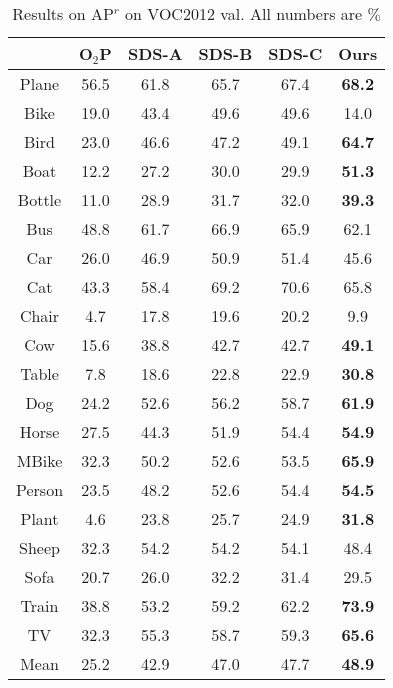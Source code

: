 \documentclass[10pt,twocolumn,letterpaper]{article}
\begin{document}
\begin{table*}[!htb]
\begin{center}
\begin{tabular}{|c|c|c|c|c|c|}         
\hline                               
       & O$_2$P & SDS-A & SDS-B & SDS-C & Ours\\   
\hline                               
Plane & 56.5 & 61.8 & 65.7 & 67.4 & \textbf{68.2} \\                                     
Bike & 19.0 & 43.4 & 49.6 & 49.6 & 14.0 \\                                      
Bird & 23.0 & 46.6 & 47.2 & 49.1 & \textbf{64.7} \\                                    
Boat & 12.2 & 27.2 & 30.0 & 29.9 & \textbf{51.3} \\                                     
Bottle & 11.0 & 28.9 & 31.7 & 32.0 & \textbf{39.3} \\                                   
Bus & 48.8 & 61.7 & 66.9 & 65.9 & 62.1 \\                                       
Car & 26.0 & 46.9 & 50.9 & 51.4 & 45.6 \\                                      
Cat & 43.3 & 58.4 & 69.2 & 70.6 & 65.8 \\                                       
Chair & 4.7 & 17.8 & 19.6 & 20.2 & 9.9 \\                                       
Cow & 15.6 & 38.8 & 42.7 & 42.7 & \textbf{49.1} \\                                       
Table & 7.8 & 18.6 & 22.8 & 22.9 & \textbf{30.8} \\                                      
Dog & 24.2 & 52.6 & 56.2 & 58.7 & \textbf{61.9} \\                                       
Horse & 27.5 & 44.3 & 51.9 & 54.4 & \textbf{54.9} \\                                     
MBike & 32.3 & 50.2 & 52.6 & 53.5 & \textbf{65.9} \\                                     
Person & 23.5 & 48.2 & 52.6 & 54.4 & \textbf{54.5} \\                                    
Plant & 4.6 & 23.8 & 25.7 & 24.9 & \textbf{31.8} \\                                      
Sheep & 32.3 & 54.2 & 54.2 & 54.1 & 48.4 \\                                     
Sofa & 20.7 & 26.0 & 32.2 & 31.4 & 29.5 \\                                      
Train & 38.8 & 53.2 & 59.2 & 62.2 & \textbf{73.9} \\                                     
TV & 32.3 & 55.3 & 58.7 & 59.3 & \textbf{65.6} \\ 
\hline                                                                            
Mean & 25.2 & 42.9 & 47.0 & 47.7 & \textbf{48.9} \\   
\hline                               
\end{tabular}  
\end{center}                      
\caption{Results on AP$^r$ on VOC2012 val. All numbers are $\%$}          
\label{tab:sdsseg}
\end{table*}    
\end{document}
